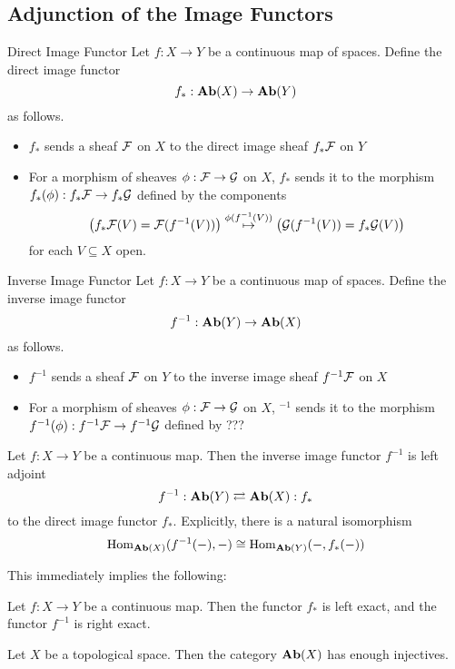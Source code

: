 \documentclass[a4paper]{article}
\begin{document}
\subsection{Adjunction of the Image Functors}
\begin{defn}{Direct Image Functor}{} Let $f:X\to Y$ be a continuous map of spaces. Define the direct image functor $$f_\ast:\bold{Ab}(X)\to\bold{Ab}(Y)$$ as follows. 
\begin{itemize}
\item $f_\ast$ sends a sheaf $\mathcal{F}$ on $X$ to the direct image sheaf $f_\ast\mathcal{F}$ on $Y$
\item For a morphism of sheaves $\phi:\mathcal{F}\to\mathcal{G}$ on $X$, $f_\ast$ sends it to the morphism $f_\ast(\phi):f_\ast\mathcal{F}\to f_\ast\mathcal{G}$ defined by the components $$\left(f_\ast\mathcal{F}(V)=\mathcal{F}(f^{-1}(V))\right)\overset{\phi(f^{-1}(V))}{\mapsto}\left(\mathcal{G}(f^{-1}(V))=f_\ast\mathcal{G}(V)\right)$$ for each $V\subseteq X$ open. 
\end{itemize}
\end{defn}

\begin{defn}{Inverse Image Functor}{} Let $f:X\to Y$ be a continuous map of spaces. Define the inverse image functor $$f^{-1}:\bold{Ab}(Y)\to\bold{Ab}(X)$$ as follows. 
\begin{itemize}
\item $f^{-1}$ sends a sheaf $\mathcal{F}$ on $Y$ to the inverse image sheaf $f^{-1}\mathcal{F}$ on $X$
\item For a morphism of sheaves $\phi:\mathcal{F}\to\mathcal{G}$ on $X$, $^{-1}$ sends it to the morphism $f^{-1}(\phi):f^{-1}\mathcal{F}\to f^{-1}\mathcal{G}$ defined by ???
\end{itemize}
\end{defn}

\begin{thm}{}{} Let $f:X\to Y$ be a continuous map. Then the inverse image functor $f^{-1}$ is left adjoint $$f^{-1}:\bold{Ab}(Y)\rightleftarrows\bold{Ab}(X):f_\ast$$ to the direct image functor $f_\ast$. Explicitly, there is a natural isomorphism $$\operatorname{Hom}_{\bold{Ab}(X)}(f^{-1}(-),-)\cong\operatorname{Hom}_{\bold{Ab}(Y)}(-,f_\ast(-))$$
\end{thm}

This immediately implies the following: 
\begin{crl}{}{} Let $f:X\to Y$ be a continuous map. Then the functor $f_\ast$ is left exact, and the functor $f^{-1}$ is right exact. 
\end{crl}

\begin{thm}{}{} Let $X$ be a topological space. Then the category $\bold{Ab}(X)$ has enough injectives. 
\end{thm}
\end{document}
